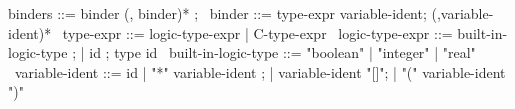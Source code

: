 \begin{syntax}
  binders ::= binder (, binder)* ;
  \
  binder ::= type-expr variable-ident;
             (,variable-ident)*
  \
  type-expr ::= logic-type-expr | C-type-expr
  \
  logic-type-expr ::= built-in-logic-type ;
  | id ; type id
  \
  built-in-logic-type ::= "boolean" | "integer" | "real"
  \
  variable-ident ::= id
  | "*" variable-ident ;
  | variable-ident "[]";
  | "(" variable-ident ")"
\end{syntax}
